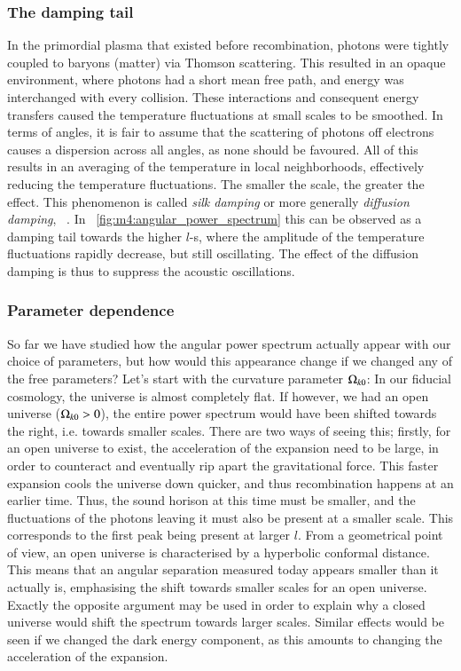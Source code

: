     \subsubsection{The damping tail}
        In the primordial plasma that existed before recombination, photons were tightly coupled to baryons (matter) via Thomson scattering. This resulted in an opaque environment, where photons had a short mean free path, and energy was interchanged with every collision. These interactions and consequent energy transfers caused the temperature fluctuations at small scales to be smoothed. In terms of angles, it is fair to assume that the scattering of photons off electrons causes a dispersion across all angles, as none should be favoured. All of this results in an averaging of the temperature in local neighborhoods, effectively reducing the temperature fluctuations. The smaller the scale, the greater the effect. This phenomenon is called \textit{silk damping} or more generally \textit{diffusion damping}, ~\cite{dodelson2020modern}. In ~\cref{fig:m4:angular_power_spectrum} this can be observed as a damping tail towards the higher $l$-s, where the amplitude of the temperature fluctuations rapidly decrease, but still oscillating. The effect of the diffusion damping is thus to suppress the acoustic oscillations. 

    \subsubsection{Parameter dependence}
        So far we have studied how the angular power spectrum actually appear with our choice of parameters, but how would this appearance change if we changed any of the free parameters? Let's start with the curvature parameter $\Omega_{k0}$: In our fiducial cosmology, the universe is almost completely flat. If however, we had an open universe ($\Omega_{k0}>0$), the entire power spectrum would have been shifted towards the right, i.e. towards smaller scales. There are two ways of seeing this; firstly, for an open universe to exist, the acceleration of the expansion need to be large, in order to counteract and eventually rip apart the gravitational force. This faster expansion cools the universe down quicker, and thus recombination happens at an earlier time. Thus, the sound horison at this time must be smaller, and the fluctuations of the photons leaving it must also be present at a smaller scale. This corresponds to the first peak being present at larger $l$. From a geometrical point of view, an open universe is characterised by a hyperbolic conformal distance. This means that an angular separation measured today appears smaller than it actually is, emphasising the shift towards smaller scales for an open universe. Exactly the opposite argument may be used in order to explain why a closed universe would shift the spectrum towards larger scales. Similar effects would be seen if we changed the dark energy component, as this amounts to changing the acceleration of the expansion. 

